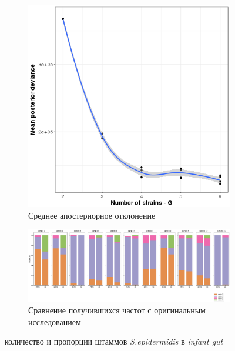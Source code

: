 \documentclass{spbau-diploma}
\begin{document}
\begin{figure}
    \centering
    \begin{subfigure}[b]{0.7\textwidth}
        \includegraphics[width=\textwidth]{pics/infant_gut_dev.png}
        \caption{Среднее апостериорное отклонение}
    \end{subfigure}
      
    \hfill
      
    \begin{subfigure}[b]{1.0\textwidth}
        \includegraphics[width=\textwidth]{pics/infant_gut_results.png}
        \caption{Сравнение получившихся частот с оригинальным исследованием}
    \end{subfigure}
    
    \caption{количество и пропорции штаммов \textit{S.epidermidis} в \textit{infant gut}}\label{infant_gut_figs}
\end{figure}
\end{document}
